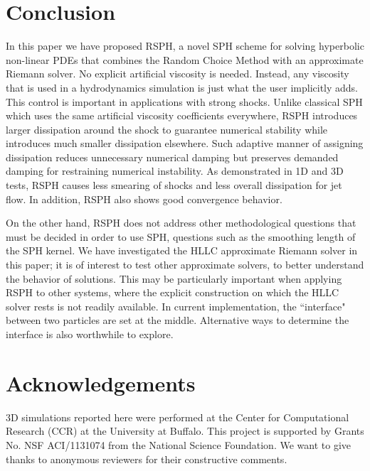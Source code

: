 \section{Conclusion} \label{discussion}
In this paper we have proposed RSPH, a novel SPH scheme for solving hyperbolic non-linear PDEs that combines the Random Choice Method with an approximate Riemann solver. No explicit artificial viscosity is needed. Instead, any viscosity that is used in a hydrodynamics simulation is just what the user implicitly adds. 
This control is important in applications with strong shocks. 
Unlike classical SPH which uses the same artificial viscosity coefficients everywhere, RSPH introduces larger dissipation around the shock to guarantee numerical stability while introduces much smaller dissipation elsewhere. Such adaptive manner of assigning dissipation reduces unnecessary numerical damping but preserves demanded damping for restraining numerical instability. As demonstrated in 1D and 3D tests, RSPH causes less smearing of shocks and less overall dissipation for jet flow.
In addition, RSPH also shows good convergence behavior.

On the other hand, RSPH does not address other methodological questions that must be decided in order to use SPH, questions such as the smoothing length of the SPH kernel. We have investigated the HLLC approximate Riemann solver in this paper; it is of interest to test other approximate solvers, to better understand the behavior of solutions. This may be particularly important when applying RSPH to other systems, where the explicit construction on which the HLLC solver rests is not readily available. In current implementation, the ``interface" between two particles are set at the middle. Alternative ways to determine the interface is also worthwhile to explore. 

\section{Acknowledgements}
3D simulations reported here were performed at the Center for Computational Research (CCR) at the University at Buffalo. This project is supported by Grants No. NSF ACI/1131074 from the National Science Foundation. We want to give thanks to anonymous reviewers for their constructive comments.

\appendix
